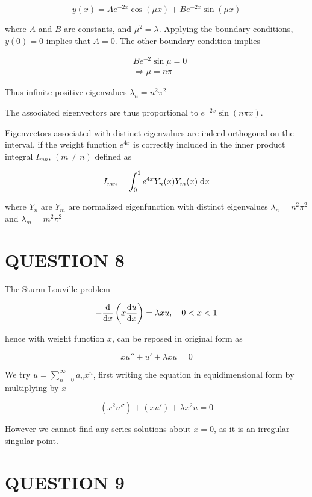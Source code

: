 \documentclass[a4paper]{article}
\begin{document}
\begin{enumerate}
	\[ y(x) = Ae^{-2x} \cos(\mu x) + B e^{-2x} \sin(\mu x) \]
	
	where $ A $ and $ B $ are constants, and $ \mu^{2} = \lambda $. Applying the boundary conditions, $ y(0) = 0 $ implies that $ A = 0 $. The other boundary condition implies

	\begin{align*}
	& B e^{-2} \sin \mu  = 0 \\
	& \Rightarrow \mu = n \pi
	\end{align*}
	
	Thus infinite positive eigenvalues $ \lambda_{n} = n^{2} \pi^{2} $
	
	The associated eigenvectors are thus proportional to $ e^{-2x} \sin (n \pi x) $.
	
	Eigenvectors associated with distinct eigenvalues are indeed orthogonal on the interval, if the weight function $ e^{4x} $ is correctly included in the inner product integral $ I_{mn} $, $ (m \neq n) $ defined as
	
	\[ I_{mn} = \int_{0}^{1} e^{4x} Y_{n}(x)Y_{m}(x) \; \mathrm{d} x \]
	
	where $ Y_{n} $ are $ Y_{m} $ are normalized eigenfunction with distinct eigenvalues $ \lambda_{n} = n^{2} \pi^{2} $ and $ \lambda_{m} = m^{2} \pi^{2} $
	
	
	
	
	
\end{enumerate}



\section{QUESTION 8}

The Sturm-Louville problem

\[ - \frac{\mathrm{d} }{\mathrm{d} x} \left(  x \frac{\mathrm{d} u}{\mathrm{d} x} \right) = \lambda x u , \quad 0 < x < 1  \]

hence with weight function $ x $, can be reposed in original form as

\[ xu'' + u' + \lambda x u = 0 \]

We try $ u = \sum_{n=0}^{\infty} a_{n}x^{n} $, first writing the equation in equidimensional form by multiplying by $ x $

\[ (x^{2}u'') + (xu') + \lambda x^{2} u = 0 \]

However we cannot find any series solutions about $ x = 0 $, as it is an irregular singular point.









\section{QUESTION 9}
\end{document}
